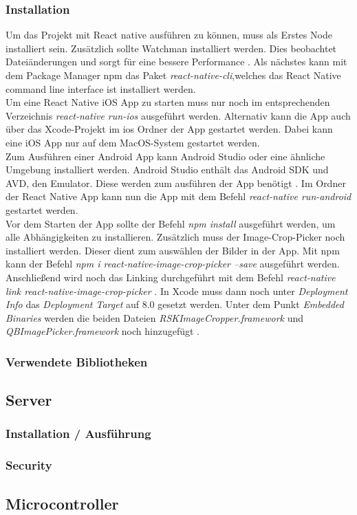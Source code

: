         \subsubsection{Installation}
Um das Projekt mit React native ausführen zu können, muss als Erstes Node installiert sein. Zusätzlich sollte Watchman installiert werden. Dies beobachtet Dateiänderungen und sorgt für eine bessere Performance \cite{facebook_inc._start_2017}.  Als nächstes kann mit dem Package Manager npm das Paket \textit{react-native-cli},welches das  React Native command line interface ist installiert werden. \\

Um eine React Native iOS App zu starten muss nur noch im entsprechenden Verzeichnis \textit{react-native run-ios} ausgeführt werden. Alternativ kann die App auch über das Xcode-Projekt im ios Ordner der App gestartet werden. Dabei kann eine iOS App nur auf dem MacOS-System gestartet werden. \cite{facebook_inc._start_2017}\\

Zum Ausführen einer Android App kann Android Studio oder eine ähnliche Umgebung installiert werden. Android Studio enthält das Android SDK und AVD, den Emulator. Diese werden zum ausführen der App benötigt \cite{facebook_inc._start_2017}. Im Ordner der React Native App kann nun die App mit dem Befehl \textit{react-native run-android} gestartet werden. \\

Vor dem Starten der App sollte der Befehl \textit{npm install} ausgeführt werden, um alle Abhängigkeiten zu installieren. Zusätzlich muss der Image-Crop-Picker noch installiert werden. Dieser dient zum auswählen der Bilder in der App. Mit npm kann der Befehl \textit{npm i react-native-image-crop-picker --save} ausgeführt werden. Anschließend wird noch das Linking durchgeführt mit dem Befehl \textit{react-native link react-native-image-crop-picker} \cite{pusic_crop_2017}. In Xcode muss dann noch unter \textit{Deployment Info} das \textit{Deployment Target} auf 8.0 gesetzt werden. Unter dem Punkt \textit{Embedded Binaries} werden die beiden Dateien \textit{RSKImageCropper.framework} und \textit{QBImagePicker.framework} noch hinzugefügt \cite{pusic_crop_2017}. 

        \subsubsection{Verwendete Bibliotheken}

\subsection{Server}
    
    \subsubsection{Installation / Ausführung}
    \subsubsection{Security}

\subsection{Microcontroller}
    
    